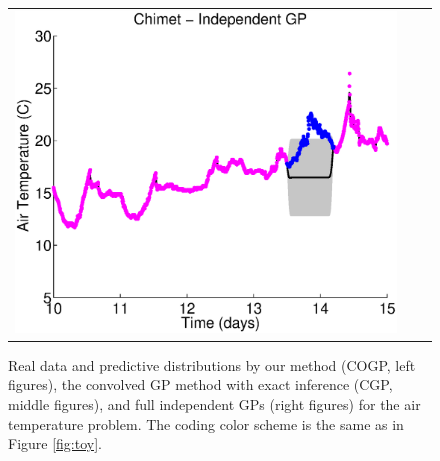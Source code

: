 \begin{figure}
\begin{tabular}{ccc}
\includegraphics[scale=0.3]{figures/weatherChimet.eps}
\end{tabular}
\caption{Real data and predictive distributions by our method (COGP, left figures), the convolved GP method with exact inference (CGP, middle figures), and full independent GPs (right figures) for the air temperature problem. The coding color scheme is the same as in Figure \ref{fig:toy}.}
\label{fig:weather}
\end{figure}

